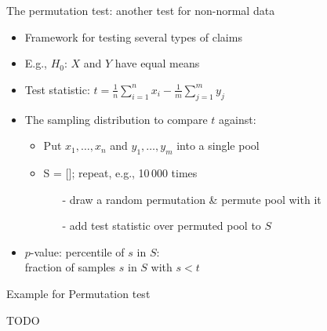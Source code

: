 \begin{frame}[c]{The permutation test: another test for non-normal data}

\begin{itemize}
	\item Framework for testing several types of claims
	\item E.g., $H_0$: $X$ and $Y$ have \alert{equal means}
	\item Test statistic: \alert{$t = \frac{1}{n}\sum_{i=1}^n x_i  - 
		\frac{1}{m}\sum_{j=1}^m y_j$}
	\pause
	\medskip
	\item The sampling distribution to compare $t$ against:
	\begin{itemize}
		\item Put $x_1, \dots, x_n$ and $y_1, \dots, y_m$ into a single pool
		\item S = []; repeat, e.g., 10\,000 times
		\begin{itemize}
			\item[-] draw a random permutation \& permute pool with it
			\item[-] add test statistic over permuted pool to $S$
		\end{itemize}
	\end{itemize}
	\pause
	\medskip
	\item $p$-value: percentile of $s$ in $S$:\\
	fraction of samples $s$ in $S$ with $s < t$
	
\end{itemize}

\end{frame}
\begin{frame}[c]{Example for Permutation test}

TODO

\end{frame}

